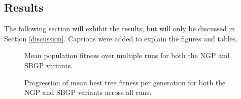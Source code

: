 \documentclass{article}
\begin{document}
\newpage

\subsection{Results}
The following section will exhibit the results, but will only be discussed in Section \ref{discussion}. Captions were added to explain the figures and tables.
\begin{figure}[H]
  \caption{Mean population fitness over multiple runs for both the NGP and SBGP variants.}
  \label{fig:gpPopResults}
\end{figure}

\begin{figure}[H]
  \caption{Progression of mean best tree fitness per generation for both the NGP and SBGP variants across all runs.}
  \label{fig:gpBestResults}
\end{figure}
\end{document}
